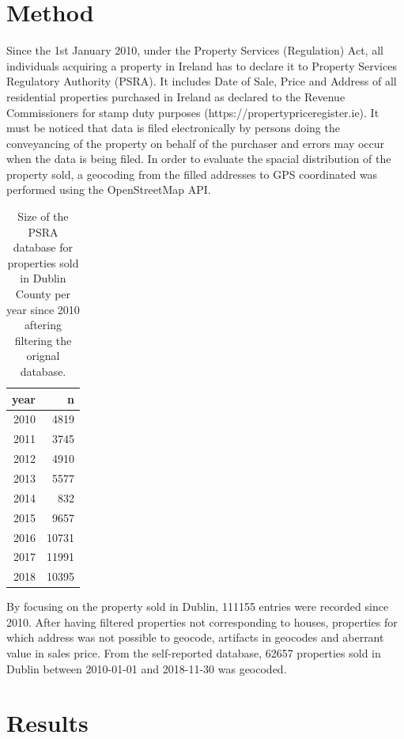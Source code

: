 \documentclass[]{elsarticle} %
\begin{document}
\section{Method}\label{method}

Since the 1st January 2010, under the Property Services (Regulation)
Act, all individuals acquiring a property in Ireland has to declare it
to Property Services Regulatory Authority (PSRA). It includes Date of
Sale, Price and Address of all residential properties purchased in
Ireland as declared to the Revenue Commissioners for stamp duty purposes
(https://propertypriceregister.ie). It must be noticed that data is
filed electronically by persons doing the conveyancing of the property
on behalf of the purchaser and errors may occur when the data is being
filed. In order to evaluate the spacial distribution of the property
sold, a geocoding from the filled addresses to GPS coordinated was
performed using the OpenStreetMap API.

\begin{table}[!h]

\caption{\label{tab:dublin-sample-size}Size of the PSRA database for properties sold in Dublin County per year since 2010 aftering filtering the orignal database.}
\centering
\fontsize{8}{10}\selectfont
\begin{tabular}{rr}
\toprule
year & n\\
\midrule
2010 & 4819\\
2011 & 3745\\
2012 & 4910\\
2013 & 5577\\
2014 & 832\\
2015 & 9657\\
2016 & 10731\\
2017 & 11991\\
2018 & 10395\\
\bottomrule
\end{tabular}
\end{table}

By focusing on the property sold in Dublin, 111155 entries were recorded
since 2010. After having filtered properties not corresponding to
houses, properties for which address was not possible to geocode,
artifacts in geocodes and aberrant value in sales price. From the
self-reported database, 62657 properties sold in Dublin between
2010-01-01 and 2018-11-30 was geocoded.

\section{Results}\label{results}
\end{document}
